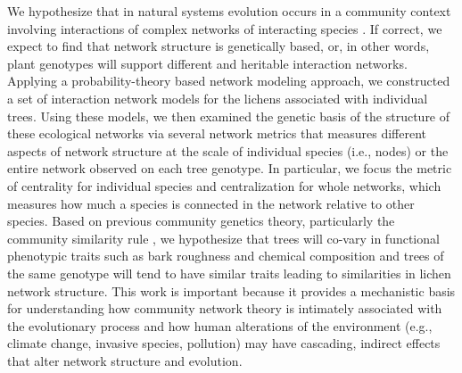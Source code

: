 \documentclass[11pt,twocolumn,twoside,lineno]{pnas-new}
\begin{document}
We hypothesize that in natural systems evolution
occurs in a community context involving interactions of complex
networks of interacting species \cite{Lau2015a, Keith2017,
  Thompson2013, Bascompte2006}. If correct, we expect to find that
network structure is genetically based, or, in other words, plant
genotypes will support different and heritable interaction
networks. Applying a probability-theory based network modeling
approach, we constructed a set of interaction network models for the
lichens associated with individual trees. Using these models, we then
examined the genetic basis of the structure of these ecological
networks via several network metrics that measures different aspects
of network structure at the scale of individual species (i.e., nodes)
or the entire network observed on each tree genotype. In particular,
we focus the metric of centrality for individual species and
centralization for whole networks, which measures how much a species
is connected in the network relative to other species. Based on
previous community genetics theory, particularly the community
similarity rule \citep{Bangert2006}, we hypothesize that trees will
co-vary in functional phenotypic traits such as bark roughness and
chemical composition and trees of the same genotype will tend to have
similar traits leading to similarities in lichen network
structure. This work is important because it provides a mechanistic
basis for understanding how community network theory is intimately
associated with the evolutionary process and how human alterations of
the environment (e.g., climate change, invasive species, pollution)
may have cascading, indirect effects that alter network structure and
evolution.
\end{document}
